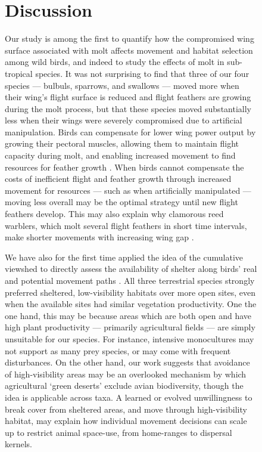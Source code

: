\begin{refsection}
\begin{figure}[!h]
\section*{Discussion}

Our study is among the first to quantify how the compromised wing surface associated with molt affects movement and habitat selection among wild birds, and indeed to study the effects of molt in sub-tropical species.
It was not surprising to find that three of our four species --- bulbuls, sparrows, and swallows --- moved more when their wing's flight surface is reduced and flight feathers are growing during the molt process, but that these species moved substantially less when their wings were severely compromised due to artificial manipulation.
Birds can compensate for lower wing power output by growing their pectoral muscles, allowing them to maintain flight capacity during molt, and enabling increased movement to find resources for feather growth \cite{chai1997,swaddle1997}.
When birds cannot compensate the costs of inefficient flight and feather growth through increased movement for resources --- such as when artificially manipulated --- moving less overall may be the optimal strategy until new flight feathers develop.
This may also explain why clamorous reed warblers, which molt several flight feathers in short time intervals, make shorter movements with increasing wing gap \cite{kiat2016}.

We have also for the first time applied the idea of the cumulative viewshed to directly assess the availability of shelter along birds' real and potential movement paths \cite{olsoy2015}.
All three terrestrial species strongly preferred sheltered, low-visibility habitats over more open sites, even when the available sites had similar vegetation productivity.
One the one hand, this may be because areas which are both open and have high plant productivity --- primarily agricultural fields --- are simply unsuitable for our species.
For instance, intensive monocultures may not support as many prey species, or may come with frequent disturbances.
On the other hand, our work suggests that avoidance of high-visibility areas may be an overlooked mechanism by which agricultural `green deserts' exclude avian biodiversity, though the idea is applicable across taxa.
A learned or evolved unwillingness to break cover from sheltered areas, and move through high-visibility habitat, may explain how individual movement decisions can scale up to restrict animal space-use, from home-ranges to dispersal kernels.


\end{figure}
\end{refsection}
